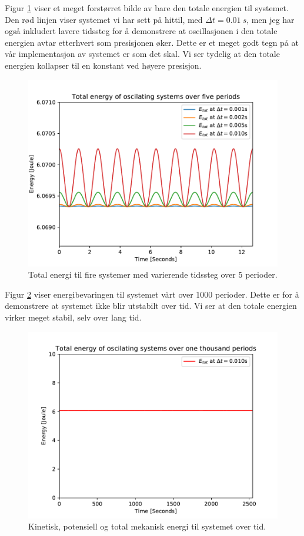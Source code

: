 \documentclass[12p,a4paper]{report}
\begin{document}
Figur \ref{fig:energy_cons2} viser et meget forstørret bilde av bare den totale energien til systemet. Den rød linjen viser systemet vi har sett på hittil, med $\Delta t = \SI{0.01}{s}$, men jeg har også inkludert lavere tidssteg for å demonstrere at oscillasjonen i den totale energien avtar etterhvert som presisjonen øker. Dette er et meget godt tegn på at vår implementasjon av systemet er som det skal. Vi ser tydelig at den totale energien kollapser til en konstant ved høyere presisjon.
\begin{figure}[H]
\centering
\includegraphics[width=\textwidth]{../fig/energy_cons2.pdf}
\caption{Total energi til fire systemer med varierende tidssteg over 5 perioder.}
\label{fig:energy_cons2}
\end{figure}

Figur \ref{fig:energy_cons3} viser energibevaringen til systemet vårt over 1000 perioder. Dette er for å demonstrere at systemet ikke blir utstabilt over tid. Vi ser at den totale energien virker meget stabil, selv over lang tid.
\begin{figure}[H]
\centering
\includegraphics[width=\textwidth]{../fig/energy_cons3.pdf}
\caption{Kinetisk, potensiell og total mekanisk energi til systemet over tid.}
\label{fig:energy_cons3}
\end{figure}
\end{document}
